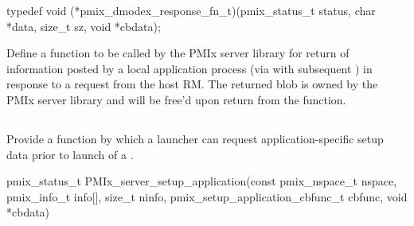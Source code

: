 \format

\cspecificstart
\begin{codepar}
typedef void (*pmix_dmodex_response_fn_t)(pmix_status_t status,
                        char *data, size_t sz,
                        void *cbdata);
\end{codepar}
\cspecificend


\begin{arglist}
\end{arglist}


\descr
Define a function to be called by the PMIx server library for return of information posted by a local application process (via  with subsequent ) in response to a request from the host RM. The returned  blob is owned by the PMIx server library and will be free’d upon return from the function.


\subsection{}

\summary

Provide a function by which a launcher can request application-specific setup data prior to launch of a .

\format

\cspecificstart
\begin{codepar}
pmix_status_t
PMIx_server_setup_application(const pmix_nspace_t nspace,
                        pmix_info_t info[], size_t ninfo,
                        pmix_setup_application_cbfunc_t cbfunc,
                        void *cbdata)
\end{codepar}
\cspecificend

\begin{arglist}
\end{arglist}

